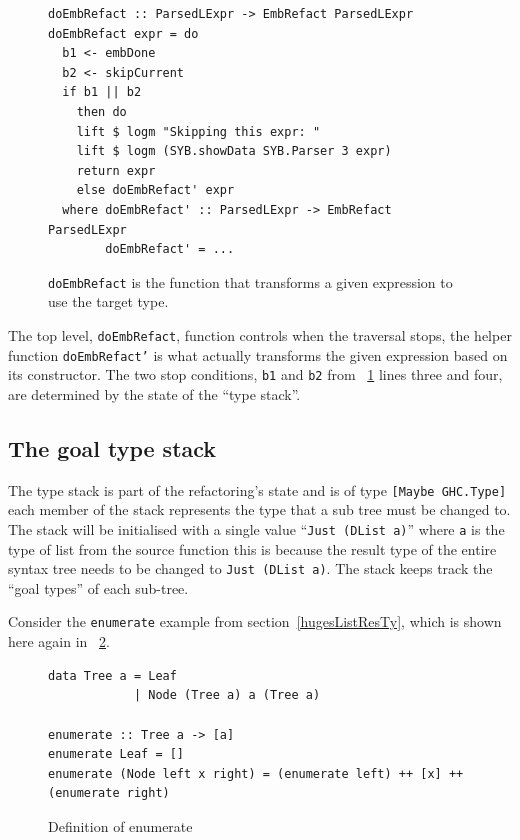 \begin{figure}[t]
\begin{lstlisting}
doEmbRefact :: ParsedLExpr -> EmbRefact ParsedLExpr
doEmbRefact expr = do
  b1 <- embDone
  b2 <- skipCurrent
  if b1 || b2
    then do
    lift $ logm "Skipping this expr: "
    lift $ logm (SYB.showData SYB.Parser 3 expr)
    return expr
    else doEmbRefact' expr
  where doEmbRefact' :: ParsedLExpr -> EmbRefact ParsedLExpr
  		doEmbRefact' = ...
\end{lstlisting}
\caption{\texttt{doEmbRefact} is the function that transforms a given expression to use the target type.}
\label{doEmbRefact}
\end{figure}

The top level, \texttt{doEmbRefact}, function controls when the traversal stops, the helper function \texttt{doEmbRefact'} is what actually transforms the given expression based on its constructor. The two stop conditions, \texttt{b1} and \texttt{b2} from \DIFdelbegin {}\DIFdelend \DIFaddbegin {}\DIFaddend ~\ref{doEmbRefact} lines three and four, are determined by the state of the ``type stack''.

\subsection{The goal type stack}
\label{typeStack}

The type stack is part of the refactoring's state and is of type \texttt{[Maybe GHC.Type]} each member of the stack represents the type that a sub tree must be changed to. The stack will be initialised with a single value ``\texttt{Just (DList a)}'' where \texttt{a} is the type of list from the source function this is because the result type of the entire syntax tree needs to be changed to \texttt{Just (DList a)}. The stack keeps track the ``goal types'' of each sub-tree. 

Consider the \texttt{enumerate} example from section~\ref{hugesListResTy}, which is shown here again in \DIFdelbegin {}\DIFdelend \DIFaddbegin {}\DIFaddend ~\ref{enumerate2}.

\begin{figure}[t]
\begin{lstlisting}
data Tree a = Leaf
            | Node (Tree a) a (Tree a)

enumerate :: Tree a -> [a]
enumerate Leaf = []
enumerate (Node left x right) = (enumerate left) ++ [x] ++ (enumerate right)

\end{lstlisting}
\caption{Definition of enumerate}
\label{enumerate2}
\end{figure}

